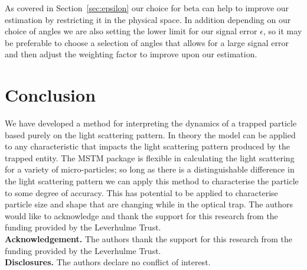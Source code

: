 \documentclass[final, 3p]{elsarticle}
\begin{document}
As covered in Section~\ref{sec:epsilon} our choice for beta can help to
improve our estimation by restricting it in the physical space. In
addition depending on our choice of angles we are also setting the
lower limit for our signal error $\epsilon$, so it may be preferable
to choose a selection of angles that allows for a large signal error
and then adjust the weighting factor to improve upon our estimation.


\section{Conclusion}
\label{sec:Conclusion}

We have developed a method for interpreting the dynamics of a trapped
particle based purely on the light scattering pattern. In theory the
model can be applied to any characteristic that impacts the light
scattering pattern produced by the trapped entity. The MSTM package is
flexible in calculating the light scattering for a variety of
micro-particles; so long as there is a distinguishable difference in
the light scattering pattern we can apply this method to characterise
the particle to some degree of accuracy. This has potential to be
applied to characterise particle size and shape that are changing
while in the optical trap. The authors would like to acknowledge and
thank the support for this research from the funding provided by the
Leverhulme Trust.\\

\noindent \textbf{Acknowledgement.} The authors thank the support for this research from the funding provided by the Leverhulme Trust. \\
  
\noindent \textbf{Disclosures.} The authors declare no conflict of interest. \\


 



\newpage
\appendix
\onecolumn
\end{document}
